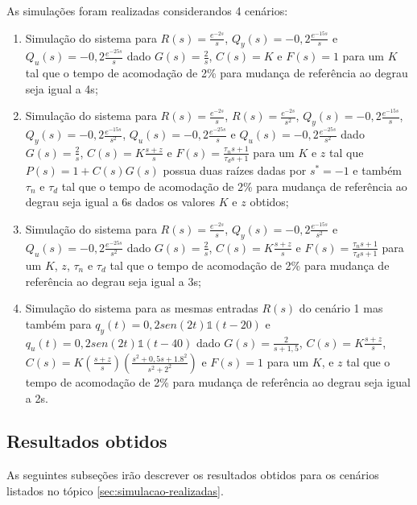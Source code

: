 As simulações foram realizadas considerandos 4 cenários:
\begin{enumerate}
    \item Simulação do sistema para $R(s) = \frac{e^{-2s}}{s}$,
    $Q_{y}(s) = -0,2\frac{e^{-15s}}{s}$ e $Q_{u}(s) = -0,2\frac{e^{-25s}}{s}$
    dado $G(s) = \frac{2}{s}$, $C(s) = K$ e $F(s) = 1$ para um $K$ tal que o
    tempo de acomodação de 2\% para mudança de referência ao degrau seja igual
    a 4s;

    \item Simulação do sistema para $R(s) = \frac{e^{-2s}}{s}$,
    $R(s) = \frac{e^{-2s}}{s^{2}}$, $Q_{y}(s) = -0,2\frac{e^{-15s}}{s}$,
    $Q_{y}(s) = -0,2\frac{e^{-15s}}{s^{2}}$, $Q_{u}(s) = -0,2\frac{e^{-25s}}{s}$
    e $Q_{u}(s) = -0,2\frac{e^{-25s}}{s^{2}}$ dado $G(s) = \frac{2}{s}$, 
    $C(s) = K\frac{s + z}{s}$ e $F(s) = \frac{\tau_{n}s + 1}{\tau_{d}s + 1}$ 
    para um $K$ e $z$ tal que $P(s) = 1 + C(s)G(s)$ possua duas raízes dadas 
    por $s^{*} = -1$ e também $\tau_{n}$ e $\tau_{d}$ tal que o tempo de
    acomodação de 2\% para mudança de referência ao degrau seja igual a 6s
    dados os valores $K$ e $z$ obtidos;

    \item Simulação do sistema para $R(s) = \frac{e^{-2s}}{s}$,
    $Q_{y}(s) = -0,2\frac{e^{-15s}}{s^{2}}$ e
    $Q_{u}(s) = -0,2\frac{e^{-25s}}{s^{2}}$ dado $G(s) = \frac{2}{s}$,
    $C(s) = K\frac{s + z}{s}$ e $F(s) = \frac{\tau_{n}s + 1}{\tau_{d}s + 1}$ 
    para um $K$, $z$, $\tau_{n}$ e $\tau_{d}$ tal que o tempo de acomodação de
    2\% para mudança de referência ao degrau seja igual a 3s;

    \item Simulação do sistema para as mesmas entradas $R(s)$ do cenário 1 mas 
    também para $q_{y}(t) = 0,2sen(2t)\mathds{1}(t - 20)$ e 
    $q_{u}(t) = 0,2sen(2t)\mathds{1}(t - 40)$ dado $G(s) = \frac{2}{s + 1,5}$, 
    $C(s) = K\frac{s + z}{s}$, 
    $C(s) = K\left(\frac{s + z}{s}\right)\left(\frac{s^2 + 0,5s + 1.8^2}{s^2 + 2^2}\right)$ 
    e $F(s) = 1$ para um $K$, e $z$ tal que o tempo de acomodação de 2\% para 
    mudança de referência ao degrau seja igual a 2s.
\end{enumerate}

\subsection{Resultados obtidos}
As seguintes subseções irão descrever os resultados obtidos para os cenários
listados no tópico \ref{sec:simulacao-realizadas}.

